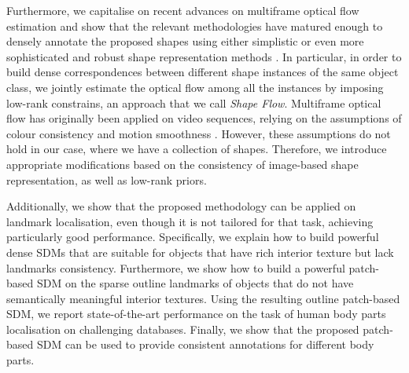 Furthermore, we capitalise on recent advances on multiframe optical flow estimation \cite{Garg:2013hu,tomasi2012dense,snape15faceflow} and show that the relevant methodologies have matured enough to densely annotate the proposed shapes using either simplistic or even more sophisticated and robust shape representation methods \cite{Nguyen2013}.
In particular, in order to build dense correspondences between different shape instances of the same object class, we jointly estimate the optical flow among all the instances by imposing low-rank constrains, an approach that we call \emph{Shape Flow}. Multiframe optical flow has originally been applied on video sequences, relying on the assumptions of colour consistency and motion smoothness \cite{Garg:2013hu}. However, these assumptions do not hold in our case, where we have a collection of shapes. Therefore, we introduce appropriate modifications based on the consistency of image-based shape representation, as well as low-rank priors.


Additionally, we show that the proposed methodology can be applied on landmark localisation, even though it is not tailored for that task, achieving particularly good performance. Specifically, we explain how to build powerful dense SDMs that are suitable for objects that have rich interior texture but lack landmarks consistency. Furthermore, we show how to build a powerful patch-based SDM on the sparse outline landmarks of objects that do not have semantically meaningful interior textures. Using the resulting outline patch-based SDM, we report state-of-the-art performance on the task of human body parts localisation on challenging databases. Finally, we show that the proposed patch-based SDM can be used to provide consistent annotations for different body parts.




